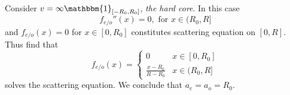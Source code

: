 \begin{example}\label{ExampleScatteringLengthHardCore}
	Consider $ v=\infty\mathbbm{1}_{[-R_0,R_0]} $, \ie \emph{the hard core}. In this case \begin{equation}
	f_{e/o}''(x)=0,\text{ for } x\in(R_0,R]
	\end{equation}
	and $ f_{e/o}(x)=0 $ for $ x\in [0,R_0] $ constitutes scattering equation on $ [0,R] $. Thus find that \begin{equation}
	f_{e/o}(x)=\begin{cases}
	0& x\in[0,R_0]\\
	\frac{x-R_0}{R-R_0}& x\in(R_0,R]
	\end{cases}
	\end{equation}
	solves the scattering equation. We conclude that $ a_e=a_o=R_0 $.
\end{example}

